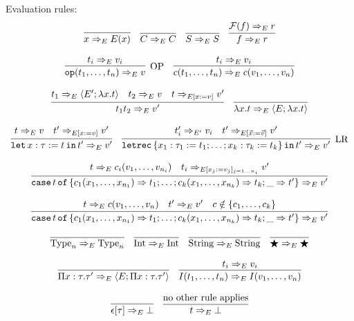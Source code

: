 \documentclass[final]{msc}
\begin{document}
Evaluation rules:
\[
\begin{array}{c}
\infer{\eval{x}{E}{E(x)}}{}\quad
\infer{\eval{C}{E}{C}}{}\quad
\infer{\eval{S}{E}{S}}{}\quad
\infer{\eval{f}{E}{r}}{\eval{\Fc(f)}{E}{r}}
\\ \\
\infer[\mathrm{OP}]{\eval{\op(t_1,\ldots,t_n)}{E}{v}}{\eval{t_i}{E}{v_i}}\quad
\infer{\eval{c(t_1,\ldots,t_n)}{E}{c(v_1,\ldots,v_n)}}{\eval{t_i}{E}{v_i}}
\\ \\
\infer{\eval{t_1 t_2}{E}{v'}}{\eval{t_1}{E}{\closure{E'}{\lambda x . t}} & \eval{t_2}{E}{v} & \eval{t}{E[x:=v]}{v'}} \quad
\infer{\eval{\lambda x . t}{E}{\closure{E}{\lambda x . t}}}{}
\\ \\
\infer{\eval{\slet{x:\tau := t}{t'}}{E}{v'}}{\eval{t}{E}{v} & \eval{t'}{E[x:=v]}{v'}}\quad
\infer[\mathrm{LR}]{\eval{\sletrec{\{x_1 : \tau_1 := t_1; \ldots; x_k : \tau_k := t_k\}}{t'}}{E}{v'}}{\eval{t_i'}{E'}{v_i} & \eval{t'}{E[\vec{x}:=\vec{v}]}{v'}}
\\ \\
\infer{\eval{\scase{t}{\{c_1(x_1,\ldots,x_{n_1}) \To t_1; \ldots; c_k(x_1,\ldots,x_{n_k}) \To t_k; \_ \To t'\}}}{E}{v'}}{\eval{t}{E}{c_i(v_1,\ldots,v_{n_i})} & \eval{t_i}{E[x_j := v_j]_{j=1\ldots n_i}}{v'}}
\\ \\
\infer{\eval{\scase{t}{\{c_1(x_1,\ldots,x_{n_1}) \To t_1; \ldots; c_k(x_1,\ldots,x_{n_k}) \To t_k; \_ \To t'\}}}{E}{v'}}{\eval{t}{E}{c(v_1,\ldots,v_n)} & \eval{t'}{E}{v'} & c \notin \{c_1,\ldots,c_k\}}
\\ \\
\infer{\eval{\Type_n}{E}{\Type_n}}{}\quad
\infer{\eval{\Int}{E}{\Int}}{}\quad
\infer{\eval{\String}{E}{\String}}{}\quad
\infer{\eval{\Dynamic}{E}{\Dynamic}}{}
\\ \\
\infer{\eval{\Pi x : \tau . \tau'}{E}{\closure{E}{\Pi x : \tau . \tau'}}}{}\quad
\infer{\eval{I(t_1,\ldots,t_n)}{E}{I(v_1,\ldots,v_n)}}{\eval{t_i}{E}{v_i}}
\\ \\
\infer{\eval{\epsilon[\tau]}{E}{\bot}}{}\quad
\infer{\eval{t}{E}{\bot}}{\text{no other rule applies}}
\end{array}
\]
\end{document}
